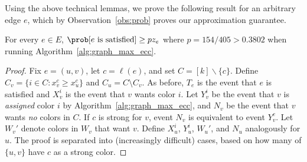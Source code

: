 Using the above technical lemmas, we prove the following result for an arbitrary edge $e$, which by Observation~\ref{obs:prob} proves our approximation guarantee.
\begin{theorem}
	\label{thm:graphecc}
	For every $e \in E$, $\prob[\text{$e$ is satisfied}] \geq p z_e$ where $p = {154}/{405} > 0.3802$ when running Algorithm~\ref{alg:graph_max_ecc}.
\end{theorem}
\vspace{-10pt}
\begin{proof}

	Fix $e = (u,v)$, let $c = \ell(e)$, and set $C = [k] \backslash \{c\}$.
	Define $C_v = \{i \in C \colon x_v^c \geq x_u^c\}$ and $C_u = C \setminus C_v$. As before, $T_e$ is the event that $e$ is satisfied and $X_v^i$ is the event that $v$ wants color $i$. Let $Y_v^i$ be the event that $v$ is \emph{assigned} color $i$ by Algorithm~\ref{alg:graph_max_ecc}, and $N_v$ be the event that $v$ wants \emph{no} colors in $C$. If $c$ is strong for $v$, event $N_v$ is equivalent to event $Y_v^c$. Let $W_v'$ denote colors in $W_v$ that {want} $v$. Define $X_u^i$, $Y_u^i$, $W_u'$, and $N_u$ analogously for $u$. The proof is separated into (increasingly difficult) cases, based on how many of $\{u,v\}$ have $c$ as a strong color.

	\bigbreak


\end{proof}
